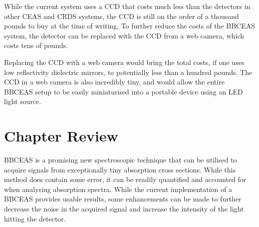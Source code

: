 While the current system uses a \ac{CCD} that costs much less than the
detectors in other \ac{CEAS} and \ac{CRDS} systems, the \ac{CCD} is still on
the order of a thousand pounds to buy at the time of writing. To further reduce
the costs of the \ac{BBCEAS} system, the detector can be replaced with the
\ac{CCD} from a web camera, which costs tens of pounds.

Replacing the \ac{CCD} with a web camera would bring the total costs, if one
uses low reflectivity dielectric mirrors, to potentially less than a hundred
pounds. The \ac{CCD} in a web camera is also incredibly tiny, and would allow
the entire \ac{BBCEAS} setup to be easily miniaturised into a portable device
using an \ac{LED} light source.


\section*{Chapter Review}

\ac{BBCEAS} is a promising new spectroscopic technique that can be utilised to
acquire signals from exceptionally tiny absorption cross sections. While this
method does contain some error, it can be readily quantified and accounted
for when analysing absorption spectra. While the current implementation of a
\ac{BBCEAS} provides usable results, some enhancements can be made to further
decrease the noise in the acquired signal and increase the intensity of the
light hitting the detector.
